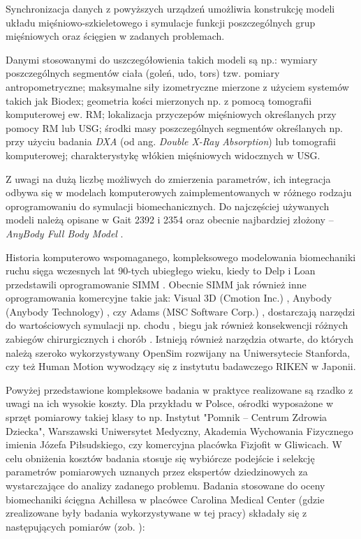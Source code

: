 Synchronizacja danych z powyższych urządzeń umożliwia konstrukcję modeli układu mięśniowo-szkieletowego i symulacje funkcji poszczególnych grup mięśniowych oraz ścięgien w zadanych problemach.

Danymi stosowanymi do uszczegółowienia takich modeli są np.: wymiary poszczególnych segmentów ciała (goleń, udo, tors) tzw. pomiary antropometryczne; maksymalne siły izometryczne mierzone z użyciem systemów takich jak Biodex; geometria kości mierzonych np. z pomocą tomografii komputerowej ew. RM; lokalizacja przyczepów mięśniowych określanych przy pomocy RM lub USG; środki masy poszczególnych segmentów określanych np. przy użyciu badania \textit{DXA} (od ang. \textit{Double X-Ray Absorption}) lub tomografii komputerowej; charakterystykę włókien mięśniowych widocznych w USG.

Z uwagi na dużą liczbę możliwych do zmierzenia parametrów, ich integracja odbywa się w modelach komputerowych zaimplementowanych w różnego rodzaju oprogramowaniu do symulacji biomechanicznych. Do najczęściej używanych modeli należą opisane w \cite{John2013} Gait 2392 i 2354 oraz obecnie najbardziej złożony -- \textit{AnyBody Full Body Model} \cite{Bassani2017}. 

Historia komputerowo wspomaganego, kompleksowego modelowania biomechaniki ruchu sięga wczesnych lat 90-tych ubiegłego wieku, kiedy to Delp i Loan przedstawili oprogramowanie SIMM \cite{Delp1990}. Obecnie SIMM jak również inne oprogramowania komercyjne takie jak: Visual 3D (Cmotion Inc.) \cite{Visual3D}, Anybody (Anybody Technology) \cite{AnyBody}, czy Adams (MSC Software Corp.) \cite{Adams}, dostarczają narzędzi \linebreak do wartościowych symulacji np. chodu \cite{Steele2010}, biegu \cite{Hamner2010} jak również konsekwencji różnych zabiegów chirurgicznych \cite{Gomes2013} i chorób \cite{Shao2009}. Istnieją również narzędzia otwarte, do których należą szeroko wykorzystywany OpenSim \cite{Delp2007} rozwijany na Uniwersytecie Stanforda, czy też Human Motion \cite{Riken} wywodzący się z instytutu badawczego RIKEN w Japonii.

Powyżej przedstawione kompleksowe badania w praktyce realizowane są rzadko z uwagi na ich wysokie koszty. Dla przykładu w Polsce, ośrodki wyposażone \linebreak w sprzęt pomiarowy takiej klasy to np. Instytut "Pomnik – Centrum Zdrowia Dziecka", Warszawski Uniwersytet Medyczny, Akademia Wychowania Fizycznego imienia Józefa Piłsudskiego, czy komercyjna placówka Fizjofit w Gliwicach. W celu obniżenia kosztów badania stosuje się wybiórcze podejście i selekcję parametrów pomiarowych uznanych przez ekspertów dziedzinowych za wystarczające do analizy zadanego problemu. Badania stosowane do oceny biomechaniki ścięgna Achillesa w placówce Carolina Medical Center (gdzie zrealizowane były badania wykorzystywane w tej pracy) składały się z następujących pomiarów (zob. \cite{CMC}):

